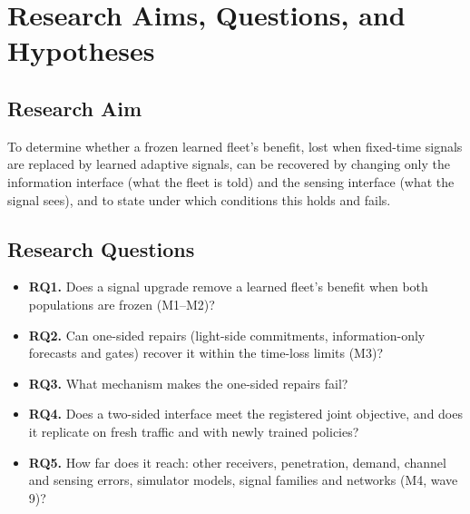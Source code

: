 \section{Research Aims, Questions, and Hypotheses}\label{sec:aims}
\subsection{Research Aim}
To determine whether a frozen learned fleet's benefit, lost when fixed-time signals are replaced by learned adaptive signals, can be recovered by
changing only the information interface (what the fleet is told) and the sensing interface (what the signal sees), and to state under
which conditions this holds and fails.

\subsection{Research Questions}
\begin{itemize}\setlength\itemsep{1pt}
\item \textbf{RQ1.} Does a signal upgrade remove a learned fleet's benefit when both populations are frozen (M1--M2)?
\item \textbf{RQ2.} Can one-sided repairs (light-side commitments, information-only forecasts and gates) recover it within the time-loss
limits (M3)?
\item \textbf{RQ3.} What mechanism makes the one-sided repairs fail?
\item \textbf{RQ4.} Does a two-sided interface meet the registered joint objective, and does it replicate on fresh traffic and with newly
trained policies?
\item \textbf{RQ5.} How far does it reach: other receivers, penetration, demand, channel and sensing errors, simulator models, signal
families and networks (M4, wave 9)?
\end{itemize}

